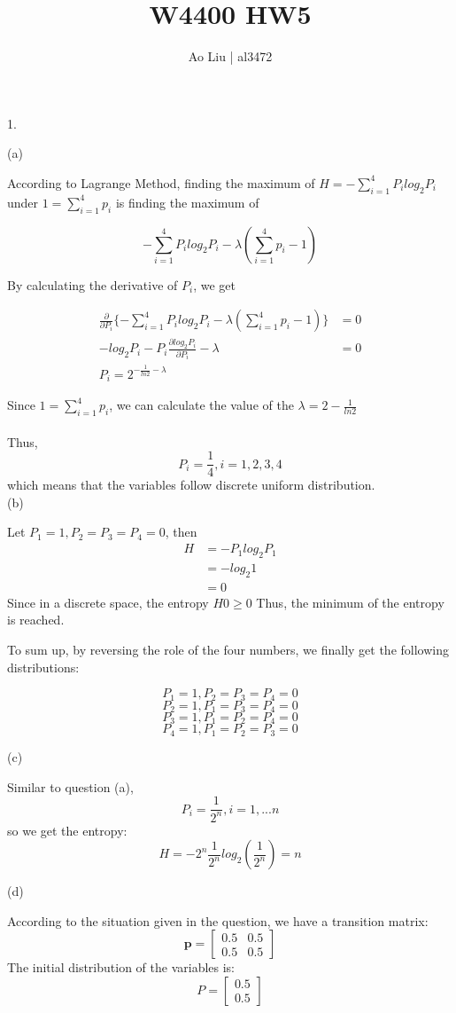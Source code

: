 \documentclass[10pt]{article}
\title{W4400 HW5}
\author{Ao Liu | al3472}
\begin{document}
\maketitle


1.


(a)


According to Lagrange Method, finding the maximum of $H=-\sum_{i=1}^{4}P_ilog_2P_i$  under $1=\sum_{i=1}^{4}p_i$ is finding the maximum of 

$$-\sum_{i=1}^{4}P_ilog_2P_i-\lambda (\sum_{i=1}^{4}p_i-1)$$

By calculating the derivative of $P_i$, we get 


\begin{align}
\frac{\partial}{\partial P_i}\{-\sum_{i=1}^{4}P_ilog_2P_i-\lambda (\sum_{i=1}^{4}p_i-1)\}&=0\nonumber\\
-log_2P_i-P_i\frac{\partial log_2P_i}{\partial P_i}-\lambda&=0\nonumber\\
P_i=2^{-\frac{1}{ln2}-\lambda}\nonumber
\end{align}

Since $1=\sum_{i=1}^{4}p_i$, we can calculate the value of the $\lambda=2-\frac{1}{ln2}$
\\\\
Thus, $$P_i=\frac{1}{4}, i=1,2,3,4$$which means that the variables follow discrete uniform distribution.
\\
(b)


Let $P_1=1, P_2=P_3=P_4=0$, then 
\begin{align}
H&=-P_1log_2P_1\nonumber\\
&=-log_2{1}\nonumber\\
&=0\nonumber
\end{align}
Since in a discrete space, the entropy $H0\geq0$
Thus, the minimum of the entropy is reached.

To sum up, by reversing the role of the four numbers, we finally get the following distributions:

$$P_1=1, P_2=P_3=P_4=0$$
$$P_2=1, P_1=P_3=P_4=0$$
$$P_3=1, P_1=P_2=P_4=0$$
$$P_4=1, P_1=P_2=P_3=0$$


(c)

Similar to question (a), $$P_i=\frac{1}{2^{n}}, i=1,...n$$
so we get the entropy:
$$H=-2^{n}\frac{1}{2^{n}}log_2(\frac{1}{2^{n}})=n$$


(d)

According to the situation given in the question, we have a transition matrix:
$$\textbf{p}=
\begin{bmatrix}
0.5&0.5\\0.5&0.5
\end{bmatrix}
$$
The initial distribution of the variables is:
$$
P=
\begin{bmatrix}
0.5\\  0.5
\end{bmatrix}
$$
\end{document}
